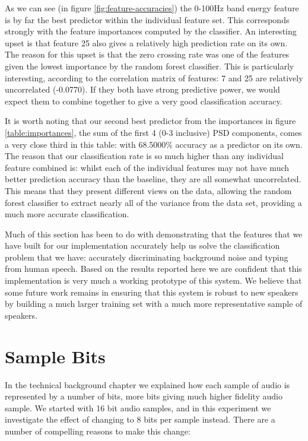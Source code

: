 \documentclass[ %
                    author={Sam Phippen},
                supervisor={Dr. Rafal Bogacz},
                     title={Real time voice activity detectors in noisy personal computing environments},
                  subtitle={},
                    degree={MEng},
                      year={2012} ]{thesis}
\begin{document}
As we can see (in figure \ref{fig:feature-accuracies}) the 0-100Hz band energy
feature is by far the best predictor within the individual feature set. This
corresponds strongly with the feature importances computed by the classifier.
An interesting upset is that feature 25 also gives a relatively high prediction
rate on its own. The reason for this upset is that the zero crossing rate was
one of the features given the lowest importance by the random forest
classifier. This is particularly interesting, according to the correlation
matrix of features: 7 and 25 are relatively uncorrelated (-0.0770). If they
both have strong predictive power, we would expect them to combine together to
give a very good classification accuracy.

It is worth noting that our second best predictor from the importances in
figure \ref{table:importances}, the sum of the first 4 (0-3 inclusive) PSD
components, comes a very close third in this table: with 68.5000\% accuracy as
a predictor on its own. The reason that our classification rate is so much
higher than any individual feature combined is: whilst each of the individual
features may not have much better prediction accuracy than the baseline, they
are all somewhat uncorrelated. This means that they present different views on
the data, allowing the random forest classifier to extract nearly all of the
variance from the data set, providing a much more accurate classification.

Much of this section has been to do with demonstrating that the features that
we have built for our implementation accurately help us solve the
classification problem that we have: accurately discriminating background noise
and typing from human speech. Based on the results reported here we are
confident that this implementation is very much a working prototype of this
system. We believe that some future work remains in ensuring that this system
is robust to new speakers by building a much larger training set with a much
more representative sample of speakers.

\section{Sample Bits}

In the technical background chapter we explained how each sample of audio is
represented by a number of bits, more bits giving much higher fidelity audio
sample. We started with 16 bit audio samples, and in this experiment we
investigate the effect of changing to 8 bits per sample instead. There are a
number of compelling reasons to make this change:
\end{document}
